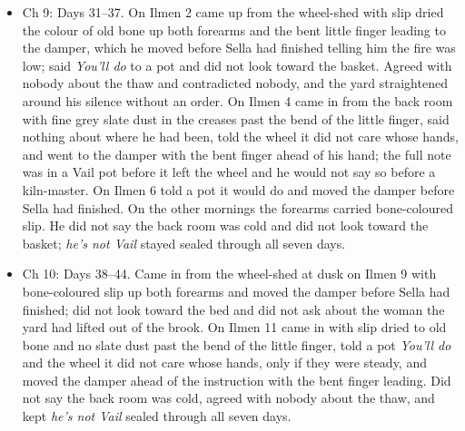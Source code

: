 \documentclass{design/chronicle}
\begin{document}
{\begin{itemize}[leftmargin=1.4em,itemsep=1pt,topsep=3pt,parsep=0pt]
\end{itemize}

\begin{itemize}[leftmargin=1.4em,itemsep=1pt,topsep=3pt,parsep=0pt]

\item Ch 9: Days 31–37. On Ilmen 2 came up from the wheel-shed with slip dried the colour of old bone up both forearms and the bent little finger leading to the damper, which he moved before Sella had finished telling him the fire was low; said \emph{You’ll do} to a pot and did not look toward the basket. Agreed with nobody about the thaw and contradicted nobody, and the yard straightened around his silence without an order. On Ilmen 4 came in from the back room with fine grey slate dust in the creases past the bend of the little finger, said nothing about where he had been, told the wheel it did not care whose hands, and went to the damper with the bent finger ahead of his hand; the full note was in a Vail pot before it left the wheel and he would not say so before a kiln-master. On Ilmen 6 told a pot it would do and moved the damper before Sella had finished. On the other mornings the forearms carried bone-coloured slip. He did not say the back room was cold and did not look toward the basket; \emph{he’s not Vail} stayed sealed through all seven days.

\end{itemize}

\begin{itemize}[leftmargin=1.4em,itemsep=1pt,topsep=3pt,parsep=0pt]

\item Ch 10: Days 38–44. Came in from the wheel-shed at dusk on Ilmen 9 with bone-coloured slip up both forearms and moved the damper before Sella had finished; did not look toward the bed and did not ask about the woman the yard had lifted out of the brook. On Ilmen 11 came in with slip dried to old bone and no slate dust past the bend of the little finger, told a pot \emph{You’ll do} and the wheel it did not care whose hands, only if they were steady, and moved the damper ahead of the instruction with the bent finger leading. Did not say the back room was cold, agreed with nobody about the thaw, and kept \emph{he’s not Vail} sealed through all seven days.

\end{itemize}

\begin{itemize}[leftmargin=1.4em,itemsep=1pt,topsep=3pt,parsep=0pt]


\end{itemize}}
\end{document}

